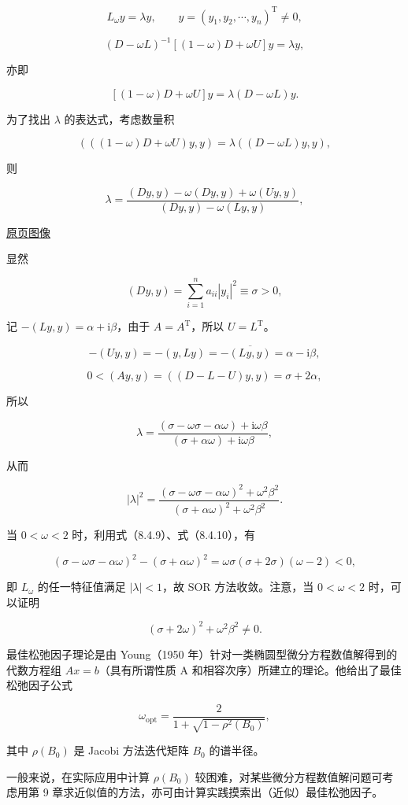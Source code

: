\documentclass[
  10pt,
  fontset=fandol]{ctexart}
\begin{document}
\[
L_\omega y=\lambda y,\qquad y=(y_1,y_2,\cdots,y_n)^{\mathrm T}\neq0,
\]

\[
(D-\omega L)^{-1}[(1-\omega)D+\omega U]y=\lambda y,
\]

亦即

\[
[(1-\omega)D+\omega U]y=\lambda(D-\omega L)y.
\]

为了找出 \(\lambda\) 的表达式，考虑数量积

\[
(((1-\omega)D+\omega U)y,y)=\lambda((D-\omega L)y,y),
\]

则

\[
\lambda=\frac{(Dy,y)-\omega(Dy,y)+\omega(Uy,y)}{(Dy,y)-\omega(Ly,y)},
\]

\href{../../source-images/pdf-229.jpeg}{原页图像}

显然

\[
(Dy,y)=\sum_{i=1}^n a_{ii}|y_i|^2\equiv\sigma>0,
\tag{8.4.9}
\]

记 \(-(Ly,y)=\alpha+\mathrm i\beta\)，由于 \(A=A^{\mathrm T}\)，所以 \(U=L^{\mathrm T}\)。

\[
-(Uy,y)=-(y,Ly)=-\overline{(Ly,y)}=\alpha-\mathrm i\beta,
\]

\[
0<(Ay,y)=((D-L-U)y,y)=\sigma+2\alpha,
\tag{8.4.10}
\]

所以

\[
\lambda=\frac{(\sigma-\omega\sigma-\alpha\omega)+\mathrm i\omega\beta}{(\sigma+\alpha\omega)+\mathrm i\omega\beta},
\]

从而

\[
|\lambda|^2=\frac{(\sigma-\omega\sigma-\alpha\omega)^2+\omega^2\beta^2}{(\sigma+\alpha\omega)^2+\omega^2\beta^2}.
\]

当 \(0<\omega<2\) 时，利用式（8.4.9）、式（8.4.10），有

\[
(\sigma-\omega\sigma-\alpha\omega)^2-(\sigma+\alpha\omega)^2
=\omega\sigma(\sigma+2\sigma)(\omega-2)<0,
\]

即 \(L_\omega\) 的任一特征值满足 \(|\lambda|<1\)，故 SOR 方法收敛。注意，当 \(0<\omega<2\) 时，可以证明

\[
(\sigma+2\omega)^2+\omega^2\beta^2\neq0.
\]

最佳松弛因子理论是由 Young（1950 年）针对一类椭圆型微分方程数值解得到的代数方程组 \(Ax=b\)（具有所谓性质 A 和相容次序）所建立的理论。他给出了最佳松弛因子公式

\[
\omega_{\mathrm{opt}}=\frac2{1+\sqrt{1-\rho^2(B_0)}},
\]

其中 \(\rho(B_0)\) 是 Jacobi 方法迭代矩阵 \(B_0\) 的谱半径。

一般来说，在实际应用中计算 \(\rho(B_0)\) 较困难，对某些微分方程数值解问题可考虑用第 9 章求近似值的方法，亦可由计算实践摸索出（近似）最佳松弛因子。
\end{document}

